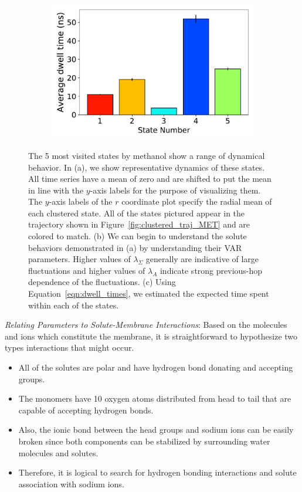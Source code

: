 \documentclass[journal=jpcbfk,manuscript=article]{achemso}
\begin{document}
\begin{figure}
\begin{subfigure}{0.41\textwidth}
  \includegraphics[width=\textwidth]{dwell_times.pdf}
  \caption{}\label{fig:dwell_times}
  \end{subfigure}
  \caption{The 5 most visited states by methanol show a range of dynamical behavior. In 
  (a), we show representative dynamics of these states. All time series have a mean of zero and are
  shifted to put the mean in line with the $y$-axis labels for the purpose of visualizing them.
  The $y$-axis labels of the $r$ coordinate plot specify the radial mean of each clustered 
  state. All of the states pictured appear in the trajectory shown in 
  Figure~\ref{fig:clustered_traj_MET} and are colored to match.
  (b) We can begin to understand the solute behaviors demonstrated in (a) by understanding their VAR 
  parameters. Higher values of $\lambda_{\Sigma}$ generally are indicative of large fluctuations
  and higher values of $\lambda_A$ indicate strong previous-hop dependence of the fluctuations.
  (c) Using Equation~\ref{eqn:dwell_times}, we estimated the expected time spent within each 
  of the states.
  }\label{fig:common_states_MET}
  \end{figure}
   
  \textit{Relating Parameters to Solute-Membrane Interactions}: Based on the
  molecules and ions which constitute the membrane, it is straightforward to 
  hypothesize two types interactions that might occur.
  \begin{itemize}  
    \item All of the solutes are polar and have hydrogen bond donating and 
    accepting groups. 
    \item The monomers have 10 oxygen atoms distributed from head to tail that are 
    capable of accepting hydrogen bonds. 
    \item Also, the ionic bond between the head groups and sodium ions can
    be easily broken since both components can be stabilized by surrounding 
    water molecules and solutes.
    \item Therefore, it is logical to search for hydrogen bonding interactions
    and solute association with sodium ions.
  \end{itemize}
  
\end{document}
